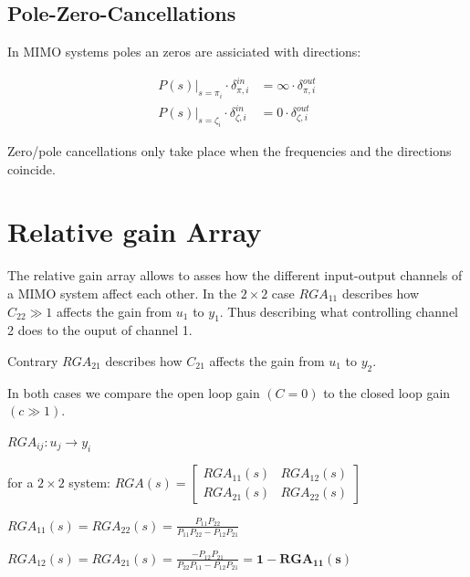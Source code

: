 \documentclass[10pt,a4paper]{scrartcl}
\begin{document}
\begin{multicols*}{3}
	\columnbreak
	
	\subsection{Pole-Zero-Cancellations}
	
	In MIMO systems poles an zeros are assiciated with directions:
	
	
	\begin{align*}	
	P(s)|_{s=\pi_i}\cdot\delta_{\pi,i}^{in}&=\infty\cdot \delta_{\pi,i}^{out}\\
	P(s)|_{s=\zeta_i}\cdot\delta_{\zeta,i}^{in}&=0\cdot\delta_{\zeta,i}^{out}\end{align*}
	
	Zero/pole cancellations only take place when the frequencies and the directions coincide.
	
	\section{Relative gain Array}
	
	
	The relative gain array allows to asses how the different input-output channels of a MIMO system affect each other. In the $2\times 2$ case $RGA_{11}$ describes how $C_{22}\gg1$ affects the gain from $u_1$ to $y_1$. Thus describing what controlling channel 2 does to the ouput of channel 1.
	
	Contrary $RGA_{21}$ describes how $C_{21}$ affects the gain from $u_1$ to $y_2$.
	
	In both cases we compare the open loop gain $(C=0)$ to the closed loop gain $(c\gg1)$. 
	
	$RGA_{ij}: u_j\rightarrow y_i$
	
	\finn	
	
	for a $2\times 2$ system: $RGA(s) = \begin{bmatrix}RGA_{11}(s)&RGA_{12}(s)\\RGA_{21}(s)&RGA_{22}(s)\end{bmatrix}$
	
	\finn	
	
	$RGA_{11}(s)=RGA_{22}(s)=\frac{P_{11}P_{22}}{P_{11}P_{22}-P_{12}P_{21}}$
	
	\finn
	
	$RGA_{12}(s)=RGA_{21}(s)=\frac{-P_{12}P_{21}}{P_{22}P_{11}-P_{12}P_{21}}=\mathbf{1-RGA_{11}(s)}$
	

\end{multicols*}
\end{document}
